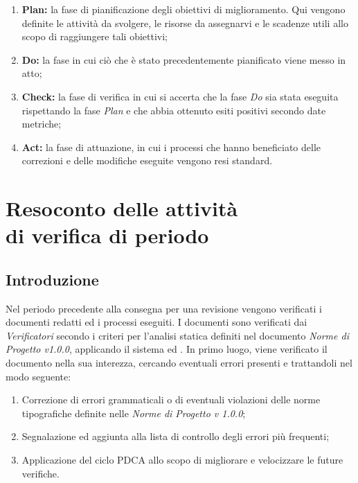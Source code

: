 \documentclass[openany,12pt,a4paper]{report}
\begin{document}
\begin{enumerate}
    \item \textbf{Plan:} la fase di pianificazione degli obiettivi di miglioramento. Qui vengono definite le attività da svolgere, le risorse da assegnarvi e le scadenze utili allo scopo di raggiungere tali obiettivi;
    \item \textbf{Do:} la fase in cui ciò che è stato precedentemente pianificato viene messo in atto;
    \item \textbf{Check:} la fase di verifica in cui si accerta che la fase \textit{Do} sia stata eseguita rispettando la fase \textit{Plan} e che abbia ottenuto esiti positivi secondo date metriche;
    \item \textbf{Act:} la fase di attuazione, in cui i processi che hanno beneficiato delle correzioni e delle modifiche eseguite vengono resi standard.
\end{enumerate}


\chapter{Resoconto delle attività \\ di verifica di periodo}

\section{Introduzione}

Nel periodo precedente alla consegna per una revisione vengono verificati i documenti redatti ed i processi eseguiti. I documenti sono verificati dai \textit{Verificatori} secondo i criteri per l'analisi statica definiti nel documento \textit{Norme di Progetto v1.0.0}, applicando il sistema  ed . In primo luogo, viene verificato il documento nella sua interezza, cercando eventuali errori presenti e trattandoli nel modo seguente:

\begin{enumerate}
	\item Correzione di errori grammaticali o di eventuali violazioni delle norme tipografiche definite nelle \textit{Norme di Progetto v 1.0.0};
	\item  Segnalazione ed aggiunta alla lista di controllo degli errori più frequenti;
	\item Applicazione del ciclo PDCA allo scopo di migliorare e velocizzare le future verifiche.
\end{enumerate}
\end{document}
